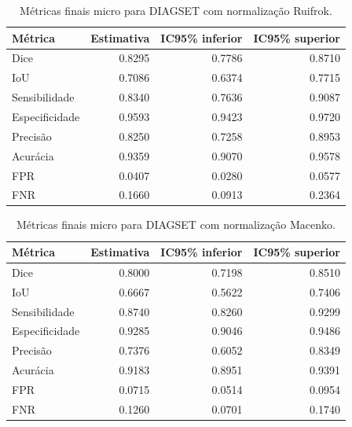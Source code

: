 \begin{table}[!htb]
\centering
\caption{Métricas finais micro para DIAGSET com normalização Ruifrok.}
\label{tab:results_diagset-micro-ruifrok}
\small
\begin{tabular}{lrrr}
\toprule
Métrica & Estimativa & IC95\% inferior & IC95\% superior \\
\midrule
Dice & 0.8295 & 0.7786 & 0.8710 \\
IoU & 0.7086 & 0.6374 & 0.7715 \\
Sensibilidade & 0.8340 & 0.7636 & 0.9087 \\
Especificidade & 0.9593 & 0.9423 & 0.9720 \\
Precisão & 0.8250 & 0.7258 & 0.8953 \\
Acurácia & 0.9359 & 0.9070 & 0.9578 \\
FPR & 0.0407 & 0.0280 & 0.0577 \\
FNR & 0.1660 & 0.0913 & 0.2364 \\
\bottomrule
\end{tabular}
\end{table}


\begin{table}[!htb]
\centering
\caption{Métricas finais micro para DIAGSET com normalização Macenko.}
\label{tab:results_diagset-micro-macenko}
\small
\begin{tabular}{lrrr}
\toprule
Métrica & Estimativa & IC95\% inferior & IC95\% superior \\
\midrule
Dice & 0.8000 & 0.7198 & 0.8510 \\
IoU & 0.6667 & 0.5622 & 0.7406 \\
Sensibilidade & 0.8740 & 0.8260 & 0.9299 \\
Especificidade & 0.9285 & 0.9046 & 0.9486 \\
Precisão & 0.7376 & 0.6052 & 0.8349 \\
Acurácia & 0.9183 & 0.8951 & 0.9391 \\
FPR & 0.0715 & 0.0514 & 0.0954 \\
FNR & 0.1260 & 0.0701 & 0.1740 \\
\bottomrule
\end{tabular}
\end{table}

